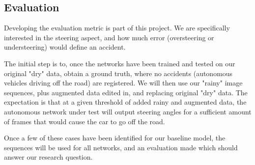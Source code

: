 
\subsection{Evaluation}

Developing the evaluation metric is part of this project. We are specifically interested in the steering aspect, and how much error (oversteering or understeering) would define an accident.

The initial step is to, once the networks have been trained and tested on our original "dry" data, obtain a ground truth, where no accidents (autonomous vehicles driving off the road) are registered. We will then use our "rainy" image sequences, plus augmented data edited in, and replacing original "dry" data. The expectation is that at a given threshold of added rainy and augmented data, the autonomous network under test will output steering angles for a sufficient amount of frames that would cause the car to go off the road.

Once a few of these cases have been identified for our baseline model, the sequences will be used for all networks, and an evaluation made which should answer our research question. 